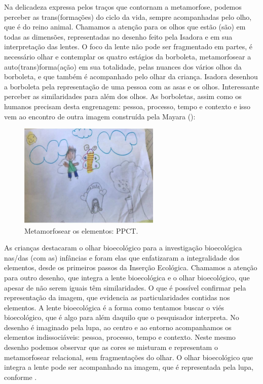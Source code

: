 \documentclass{textolivre-html}
\begin{document}
Na delicadeza expressa pelos traços que contornam a metamorfose, podemos perceber as trans(formações) do ciclo da vida, sempre acompanhadas pelo olho, que é do reino animal. Chamamos a atenção para os olhos que estão (são) em todas as dimensões, representadas no desenho feito pela Isadora e em sua interpretação das lentes. O foco da lente não pode ser fragmentado em partes, é necessário olhar e contemplar os quatro estágios da borboleta, metamorfosear a auto(trans)forma(ação) em sua totalidade, pelas nuances dos vários olhos da borboleta, e que também é acompanhado pelo olhar da criança. Isadora desenhou a borboleta pela representação de uma pessoa com as asas e os olhos. Interessante perceber as similaridades para além dos olhos. As borboletas, assim como os humanos precisam desta engrenagem: pessoa, processo, tempo e contexto e isso vem ao encontro de outra imagem construída pela Mayara (): 

\begin{figure}[h!]
 \centering
 \includegraphics[width=0.6\textwidth]{figure04.pdf}
 \caption{Metamorfosear os elementos: PPCT.}
 \label{fig-fig04}
\end{figure}

As crianças destacaram o olhar bioecológico para a investigação bioecológica nas/das (com as) infâncias e foram elas que enfatizaram a integralidade dos elementos, desde os primeiros passos da Inserção Ecológica. Chamamos a atenção para outro desenho, que integra a lente bioecológica e o olhar bioecológico, que apesar de não serem iguais têm similaridades. O que é possível confirmar pela representação da imagem, que evidencia as particularidades contidas nos elementos. A lente bioecológica é a forma como tentamos buscar o viés bioecológico, que é algo para além daquilo que o pesquisador interpreta. No desenho é imaginado pela lupa, ao centro e ao entorno acompanhamos os elementos indissociáveis: pessoa, processo, tempo e contexto. Neste mesmo desenho podemos observar que as cores se misturam e representam o metamorfosear relacional, sem fragmentações do olhar. O olhar bioecológico que integra a lente pode ser acompanhado na imagem, que é representada pela lupa, conforme . 
\end{document}
